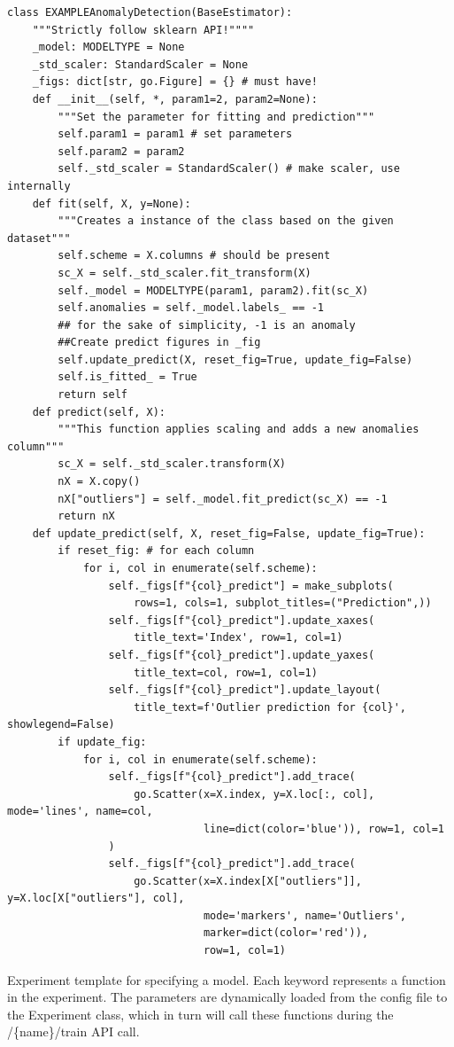 \documentclass[preprint,12pt, a4paper]{elsarticle}
\begin{document}
\begin{listing}[ht]
\begin{verbatim}
class EXAMPLEAnomalyDetection(BaseEstimator):
    """Strictly follow sklearn API!""""
    _model: MODELTYPE = None
    _std_scaler: StandardScaler = None
    _figs: dict[str, go.Figure] = {} # must have!
    def __init__(self, *, param1=2, param2=None):
        """Set the parameter for fitting and prediction"""
        self.param1 = param1 # set parameters
        self.param2 = param2
        self._std_scaler = StandardScaler() # make scaler, use internally
    def fit(self, X, y=None):
        """Creates a instance of the class based on the given dataset"""
        self.scheme = X.columns # should be present
        sc_X = self._std_scaler.fit_transform(X)
        self._model = MODELTYPE(param1, param2).fit(sc_X)
        self.anomalies = self._model.labels_ == -1 
        ## for the sake of simplicity, -1 is an anomaly
        ##Create predict figures in _fig
        self.update_predict(X, reset_fig=True, update_fig=False)
        self.is_fitted_ = True
        return self
    def predict(self, X):
        """This function applies scaling and adds a new anomalies column"""
        sc_X = self._std_scaler.transform(X)
        nX = X.copy()
        nX["outliers"] = self._model.fit_predict(sc_X) == -1
        return nX
    def update_predict(self, X, reset_fig=False, update_fig=True):
        if reset_fig: # for each column
            for i, col in enumerate(self.scheme):
                self._figs[f"{col}_predict"] = make_subplots(
                    rows=1, cols=1, subplot_titles=("Prediction",))
                self._figs[f"{col}_predict"].update_xaxes(
                    title_text='Index', row=1, col=1)
                self._figs[f"{col}_predict"].update_yaxes(
                    title_text=col, row=1, col=1)
                self._figs[f"{col}_predict"].update_layout(
                    title_text=f'Outlier prediction for {col}', showlegend=False)
        if update_fig:
            for i, col in enumerate(self.scheme):
                self._figs[f"{col}_predict"].add_trace(
                    go.Scatter(x=X.index, y=X.loc[:, col], mode='lines', name=col, 
                               line=dict(color='blue')), row=1, col=1
                )
                self._figs[f"{col}_predict"].add_trace(
                    go.Scatter(x=X.index[X["outliers"]], y=X.loc[X["outliers"], col], 
                               mode='markers', name='Outliers',
                               marker=dict(color='red')),
                               row=1, col=1)
\end{verbatim}
\caption{Experiment template for specifying a model. Each keyword represents a function in the experiment. The parameters are dynamically loaded from the config file to the Experiment class, which in turn will call these functions during the /\{name\}/train API call.}
\label{lst:new_model}
\end{listing}
\end{document}
